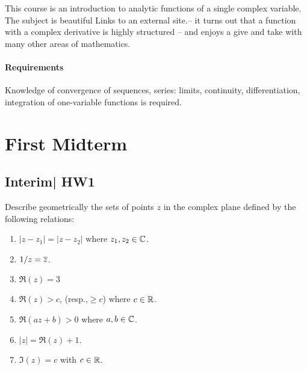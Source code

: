 \documentclass[12pt]{memoir}
\begin{document}
\maketitle
{\small
\setlength{\parindent}{0em}
\setlength{\parskip}{1em}

This course is an introduction to analytic functions of a single complex variable.  The subject is beautiful Links to an external site.-- it turns out that a function with a complex derivative is highly structured -- and enjoys a give and take with many other areas of mathematics.

\subsubsection*{Requirements}
Knowledge of convergence of sequences, series: limits, continuity, differentiation, integration of one-variable functions is required.
}
\newpage
\tableofcontents
\chapter{First Midterm}

\section{Interim| HW1}

\begin{Ej}
Describe geometrically the sets of points $z$ in the complex plane defined by the following relations:
\begin{enumerate}
    \itemsep=-0.4em
    \item $|z-z_1|=|z-z_2|$ where $z_1,z_2\in\mathbb{C}$.
    \item $1/z=\overline z$.
    \item $\Re(z)=3$
    \item $\Re(z)>c$, (resp.,$\geq c$) where $c\in\mathbb{R}$.
    \item $\Re(az+b)>0$ where $a,b\in\mathbb{C}$.
    \item $|z|=\Re(z)+1$.
    \item $\Im(z)=c$ with $c\in\mathbb{R}$.
\end{enumerate}
\end{Ej}
\end{document}
